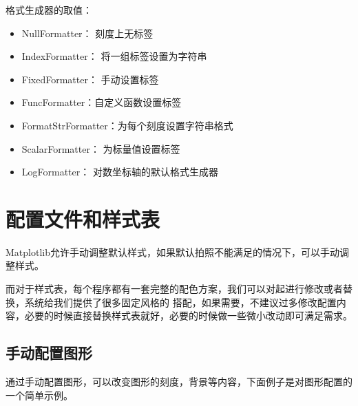 \documentclass[letterpaper,10pt,english]{sphinxhowto}
\begin{document}
格式生成器的取值：
\begin{itemize}
\item {} 
NullFormatter： 刻度上无标签

\item {} 
IndexFormatter： 将一组标签设置为字符串

\item {} 
FixedFormatter： 手动设置标签

\item {} 
FuncFormatter：自定义函数设置标签

\item {} 
FormatStrFormatter：为每个刻度设置字符串格式

\item {} 
ScalarFormatter： 为标量值设置标签

\item {} 
LogFormatter： 对数坐标轴的默认格式生成器

\end{itemize}


\section{配置文件和样式表}
\label{\detokenize{_u914d_u7f6e_u6587_u4ef6_u548c_u6837_u5f0f_u8868:id1}}\label{\detokenize{_u914d_u7f6e_u6587_u4ef6_u548c_u6837_u5f0f_u8868::doc}}
Matplotlib允许手动调整默认样式，如果默认拍照不能满足的情况下，可以手动调整样式。

而对于样式表，每个程序都有一套完整的配色方案，我们可以对起进行修改或者替换，系统给我们提供了很多固定风格的
搭配，如果需要，不建议过多修改配置内容，必要的时候直接替换样式表就好，必要的时候做一些微小改动即可满足需求。


\subsection{手动配置图形}
\label{\detokenize{_u914d_u7f6e_u6587_u4ef6_u548c_u6837_u5f0f_u8868:id2}}
通过手动配置图形，可以改变图形的刻度，背景等内容，下面例子是对图形配置的一个简单示例。

%
\begin{sphinxVerbatim}[commandchars=\\\{\}]
   
   


 
\end{sphinxVerbatim}
\end{document}
